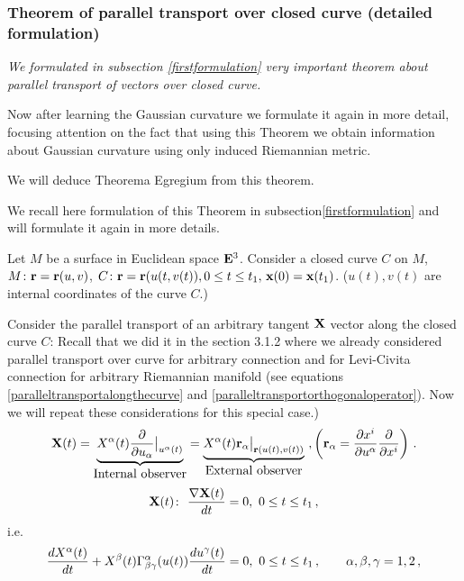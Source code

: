 \documentclass[12pt]{article}
\theoremstyle{theorem}
\numberwithin{equation}{section}
\begin{document}
{\subsubsection {Theorem of parallel transport over closed curve (detailed formulation)}\label{secondformulation}



{\sl We formulated in subsection \ref{firstformulation} 
very important theorem
about  parallel transport of vectors
over closed curve.

Now after learning the Gaussian curvature
we formulate it again in more detail,
focusing attention on the fact that  using this Theorem we
obtain information about Gaussian curvature using only
induced Riemannian metric. 

We will  deduce 
Theorema Egregium from this theorem.  









We recall here formulation of this Theorem in subsection\ref{firstformulation}
and will formulate it again in more details.

Let $M$ be a surface in  Euclidean space ${\bf E}^3$.
  Consider a closed curve $C$ on $M$,
  $M\colon {\bf r}={\bf r}(u,v)$, $C\colon {\bf r}={\bf r}(u(t,v(t)), 0\leq t\leq t_1, \, {\bf x}(0)={\bf x}(t_1)$.
  ($u(t), v(t)$ are internal coordinates of the curve $C$.)

Consider the parallel transport of an 
arbitrary tangent ${\bf X}$ vector along the closed curve $C$:
  Recall that we did it in the section 3.1.2 where we already 
considered parallel transport
over curve for arbitrary connection and for Levi-Civita connection
for arbitrary Riemannian manifold
(see equations \eqref{paralleltransportalongthecurve}
and \eqref{paralleltransportorthogonaloperator}).
 Now we will repeat these considerations for this special case.)
          \begin{equation*}\label{paraltransportalongclosedcurve1}
{\bf X}(t)= \underbrace {X^\alpha(t){\partial\over \partial u_\alpha}\big\vert_{u^\alpha(t)}}_{\hbox{Internal observer}} =
 \underbrace{X^\alpha(t){\bf r}_\alpha\big\vert_{{\bf r}(u(t),v(t))}}_{\hbox{External observer}}\,\,,\left(
 {\bf r}_\alpha={\partial x^i\over \partial u^\alpha}{\partial\over \partial x^i}\right)\,.
          \end{equation*}
          \begin{equation*}\label{paraltransportalongclosedcurve2}
{\bf X}(t)\colon\,\, {\nabla {\bf X}(t)\over dt}=0,\,\, 0\leq t\leq t_1\,,
          \end{equation*}
i.e.
                \begin{equation}\label{paraltransportalongclosedcurve3}
{d X^\alpha(t)\over dt}+
X^\beta(t)\Gamma^\alpha_{\beta\gamma}(u(t))
{du^\gamma(t)\over dt}=0,\,\, 0\leq t\leq t_1\,,\qquad \alpha,\beta,\gamma=1,2\,,
          \end{equation}

}}
\end{document}

